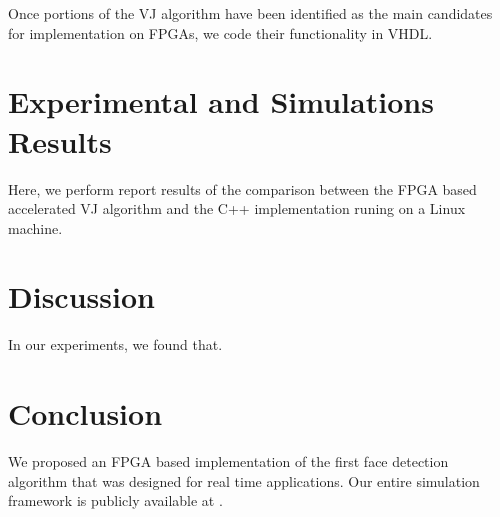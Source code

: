 \documentclass[conference]{IEEEtran}
\begin{document}
Once portions of the VJ algorithm have been identified as the main candidates for implementation on FPGAs, we code their functionality in VHDL.




\section {Experimental and Simulations Results}
\label{results_section}


Here, we perform report results of the comparison between the FPGA based accelerated VJ algorithm and the C++ implementation runing on a Linux machine.




\section {Discussion}
\label{discussion_section}


In our experiments, we found that. 




\section {Conclusion}


We proposed an FPGA based implementation of the first face detection algorithm that was designed for real time applications. 
Our entire simulation framework is publicly available at \cite{dejazzer-software}.


\end{document}
